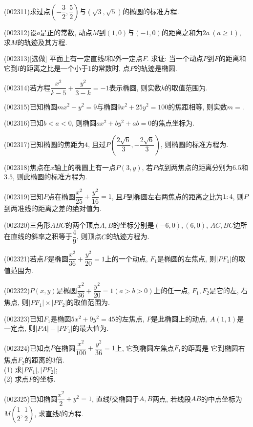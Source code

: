 \item (002311)求过点$(-\dfrac{3}{2},\dfrac{5}{2})$与$(\sqrt 3,\sqrt 5)$的椭圆的标准方程.
\item (002312)设$a$是正的常数, 动点$M$到$(1,0)$与$(-1,0)$的距离之和为$2a\ (a\ge 1)$, 求$M$的轨迹及其方程.
\item (002313)[选做]
平面上有一定直线$l$和$l$外一定点$F$. 求证: 当一个动点$P$到$F$的距离和它到$l$的距离之比是一个小于$1$的常数时, 点$P$的轨迹是椭圆.
\item (002314)若方程$\dfrac{x^2}{k-5}+\dfrac{y^2}{3-k}=-1$表示椭圆, 则实数$k$的取值范围为.
\item (002315)已知椭圆$mx^2+y^2=9$与椭圆$9x^2+25y^2=100$的焦距相等, 则实数$m=$.
\item (002316)已知$b<a<0$, 则椭圆$ax^2+by^2+ab=0$的焦点坐标为.
\item (002317)已知椭圆的焦距为$4$, 且过$P(\dfrac{2\sqrt{6}}{3},-\dfrac{2\sqrt{6}}{3})$, 则椭圆的标准方程为.
\item (002318)焦点在$x$轴上的椭圆上有一点$P(3,y)$, 若$P$点到两焦点的距离分别为$6.5$和$3.5$, 则此椭圆的标准方程为.
\item (002319)已知$P$点在椭圆$\dfrac{x^2}{25}+\dfrac{y^2}{16}=1$, 且$P$到椭圆左右两焦点的距离之比为$1:4$, 则$P$到两准线的距离之差的绝对值为.
\item (002320)三角形$ABC$的两个顶点$A,B$的坐标分别是$(-6,0),(6,0)$, $AC,BC$边所在直线的斜率之积等于$\dfrac{4}{9}$,
则顶点$C$的轨迹方程为.
\item (002321)若点$P$是椭圆$\dfrac{x^2}{36}+\dfrac{y^2}{20}=1$上的一个动点, $F_1$是椭圆的左焦点, 则$|PF_1|$的取值范围为.
\item (002322)$P(x,y)$是椭圆$\dfrac{x^2}{36}+\dfrac{y^2}{20}=1(a>b>0)$上的任一点, $F_1,F_2$是它的左, 右焦点, 则$|PF_1|\times |PF_2|$的取值范围为.
\item (002323)已知$F_1$是椭圆$5x^2+9y^2=45$的左焦点, $P$是此椭圆上的动点, $A(1,1)$是一定点, 则$|PA|+|PF_1|$的最大值为.
\item (002324)已知点$P$在椭圆$\dfrac{x^2}{100}+\dfrac{y^2}{36}=1$上, 它到椭圆左焦点$F_1$的距离是
它到椭圆右焦点$F_2$的距离的$3$倍.\\ 
(1) 求$|PF_1|,|PF_2|$;\\ 
(2) 求点$P$的坐标.
\item (002325)已知椭圆$\dfrac{x^2}{2}+y^2=1$,
直线$l$交椭圆于$A,B$两点, 若线段$AB$的中点坐标为$M(\dfrac{1}{2},\dfrac{1}{2})$, 求直线$l$的方程.
